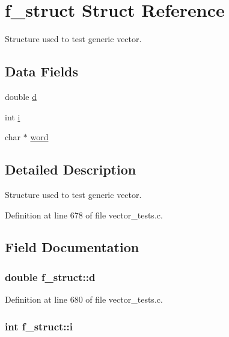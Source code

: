 \hypertarget{structf__struct}{\section{f\-\_\-struct \-Struct \-Reference}
\label{structf__struct}
}


\-Structure used to test generic vector.  


\subsection*{\-Data \-Fields}
\begin{DoxyCompactItemize}
\item 
double \hyperlink{structf__struct_aabfd173ef817f4c258a9e55aaa2ec9cf}{d}
\item 
int \hyperlink{structf__struct_a87df300d9aa87b7df7cba13e548c948f}{i}
\item 
char $\ast$ \hyperlink{structf__struct_aa8f65f08c5e6180da916f9001438eab5}{word}
\end{DoxyCompactItemize}


\subsection{\-Detailed \-Description}
\-Structure used to test generic vector. 



\-Definition at line 678 of file vector\-\_\-tests.\-c.



\subsection{\-Field \-Documentation}
\hypertarget{structf__struct_aabfd173ef817f4c258a9e55aaa2ec9cf}{
\subsubsection[{d}]{\setlength{\rightskip}{0pt plus 5cm}double {\bf f\-\_\-struct\-::d}}}\label{structf__struct_aabfd173ef817f4c258a9e55aaa2ec9cf}


\-Definition at line 680 of file vector\-\_\-tests.\-c.

\hypertarget{structf__struct_a87df300d9aa87b7df7cba13e548c948f}{
\subsubsection[{i}]{\setlength{\rightskip}{0pt plus 5cm}int {\bf f\-\_\-struct\-::i}}}\label{structf__struct_a87df300d9aa87b7df7cba13e548c948f}


